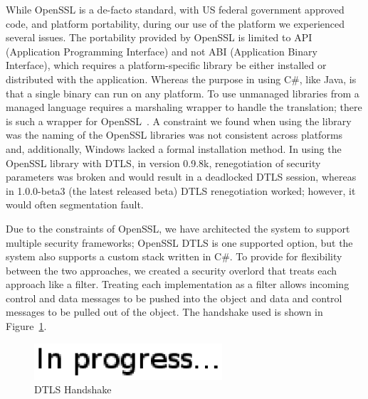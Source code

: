 \documentclass[conference]{IEEEtran}
\begin{document}
While OpenSSL is a de-facto standard, with US federal government approved code, and 
platform portability, during our use of the platform we experienced several
issues.  The portability provided by OpenSSL is limited to API (Application
Programming Interface) and not ABI (Application Binary Interface), which
requires a platform-specific library be either installed or distributed with
the application.  Whereas the purpose in using C\#, like Java, is that a single
binary can run on any platform.  To use unmanaged libraries from a managed
language requires a marshaling wrapper to handle the translation; there is
such a wrapper for OpenSSL~\cite{openssl.net}.  A constraint we found when
using the library was the naming of the OpenSSL libraries was not consistent
across platforms and, additionally, Windows lacked a formal installation method.
In using the OpenSSL library with DTLS, in version 0.9.8k, renegotiation of
security parameters  was broken and would result in a deadlocked DTLS session,
whereas in 1.0.0-beta3 (the latest released beta) DTLS renegotiation worked;
however, it would often segmentation fault.

Due to the constraints of OpenSSL, we have architected the system to support multiple security 
frameworks; OpenSSL DTLS is one supported option, but the system also supports a custom stack written in C\#.
To provide for flexibility between
the two approaches, we created a security overlord that treats each approach
like a filter.  Treating each implementation as a filter allows incoming control
and data messages to be pushed into the object and data and control messages to
be pulled out of the object.  The handshake used is shown in
Figure~\ref{fig:dtls}.

\begin{figure}[h]
\centering
\includegraphics[width=2.75in]{in_progress.eps}
\caption{DTLS Handshake}
\label{fig:dtls}
\end{figure}
\end{document}
